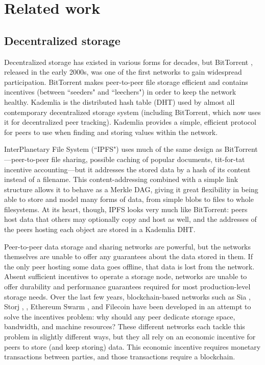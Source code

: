 \documentclass[10pt]{article}
\begin{document}
\section{Related work}
\label{sec:related}

\subsection{Decentralized storage}

Decentralized storage has existed in various forms for decades, but BitTorrent \cite{bittorrent-protocol,bittorrent-review}, released in the early 2000s, was one of the first networks to gain widespread participation. BitTorrent makes peer-to-peer file storage efficient and contains incentives (between ``seeders" and ``leechers") in order to keep the network healthy. Kademlia \cite{kademlia} is the distributed hash table (DHT) used by almost all contemporary decentralized storage system (including BitTorrent, which now uses it for decentralized peer tracking). Kademlia provides a simple, efficient protocol for peers to use when finding and storing values within the network.

InterPlanetary File System (``IPFS") \cite{ipfs} uses much of the same design as BitTorrent---peer-to-peer file sharing, possible caching of popular documents, tit-for-tat incentive accounting---but it addresses the stored data by a hash of its content instead of a filename. This content-addressing combined with a simple link structure allows it to behave as a Merkle DAG, giving it great flexibility in being able to store and model many forms of data, from simple blobs to files to whole filesystems. At its heart, though, IPFS looks very much like BitTorrent: peers host data that others may optionally copy and host as well, and the addresses of the peers hosting each object are stored in a Kademlia DHT.

Peer-to-peer data storage and sharing networks are powerful, but the networks themselves are unable to offer any guarantees about the data stored in them. If the only peer hosting some data goes offline, that data is lost from the network. Absent sufficient incentives to operate a storage node, networks are unable to offer durability and performance guarantees required for most production-level storage needs. Over the last few years, blockchain-based networks such as Sia \cite{sia}, Storj \cite{storj}, \cite{bigchaindb,bigchaindb2}, Ethereum Swarm \cite{swarm1,swarm2}, and Filecoin \cite{filecoin} have been developed in an attempt to solve the incentives problem: why should any peer dedicate storage space, bandwidth, and machine resources? These different networks each tackle this problem in slightly different ways, but they all rely on an economic incentive for peers to store (and keep storing) data. This economic incentive requires monetary transactions between parties, and those transactions require a blockchain. 
\end{document}

